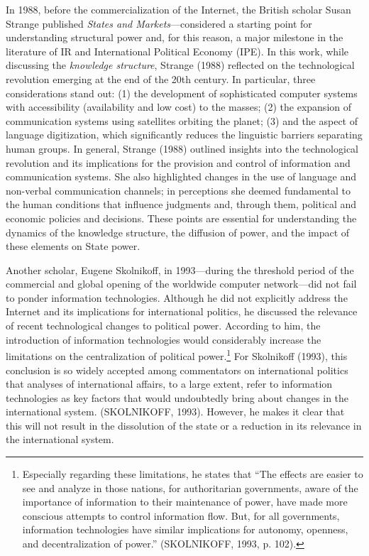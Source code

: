 In 1988, before the commercialization of the Internet, the British scholar Susan Strange published \textit{States and Markets}—considered a starting point for understanding structural power and, for this reason, a major milestone in the literature of IR and International Political Economy (IPE). In this work, while discussing the \emph{knowledge structure}, Strange (1988) reflected on the technological revolution emerging at the end of the 20th century. In particular, three considerations stand out: (1) the development of sophisticated computer systems with accessibility (availability and low cost) to the masses; (2) the expansion of communication systems using satellites orbiting the planet; (3) and the aspect of language digitization, which significantly reduces the linguistic barriers separating human groups. In general, Strange (1988) outlined insights into the technological revolution and its implications for the provision and control of information and communication systems. She also highlighted changes in the use of language and non-verbal communication channels; in perceptions she deemed fundamental to the human conditions that influence judgments and, through them, political and economic policies and decisions. These points are essential for understanding the dynamics of the knowledge structure, the diffusion of power, and the impact of these elements on State power.

Another scholar, Eugene Skolnikoff, in 1993—during the threshold period of the commercial and global opening of the worldwide computer network—did not fail to ponder information technologies. Although he did not explicitly address the Internet and its implications for international politics, he discussed the relevance of recent technological changes to political power. According to him, the introduction of information technologies would considerably increase the limitations on the centralization of political power.\footnote{Especially regarding these limitations, he states that “The effects are easier to see and analyze in those nations, for authoritarian governments, aware of the importance of information to their maintenance of power, have made more conscious attempts to control information flow. But, for all governments, information technologies have similar implications for autonomy, openness, and decentralization of power.” (SKOLNIKOFF, 1993, p. 102).} For Skolnikoff (1993), this conclusion is so widely accepted among commentators on international politics that analyses of international affairs, to a large extent, refer to information technologies as key factors that would undoubtedly bring about changes in the international system. (SKOLNIKOFF, 1993). However, he makes it clear that this will not result in the dissolution of the state or a reduction in its relevance in the international system.

